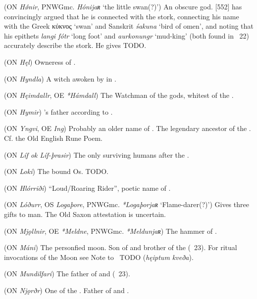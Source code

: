 \begin{itemize}
 (ON \emph{Hǿnir}, PNWGmc. \emph{Hónijaʀ} ‘the little swan(?)’)
  An obscure god. \textcite{Rydberg1886}[552] has convincingly argued that he is connected with the stork, connecting his name with the Greek \textgreek{κύκνος} ‘swan’ and Sanskrit \emph{śakuna} ‘bird of omen’, and noting that his epithets \emph{langi fótr} ‘long foot’ and \emph{aurkonungr} ‘mud-king’ (both found in \Skaldskaparmal\ 22) accurately describe the stork. He gives  TODO.

 (ON \emph{Hęl})
  Owneress of .

 (ON \emph{Hyndla})
  A witch awoken by  in \Hyndluljod.

 (ON \emph{Hęimdallr}, OE \emph{*Hámdall})
  The Watchman of the gods, whitest of the .

 (ON \emph{Hymir})
  ’s father according to \Hymiskvida.

 (ON \emph{Yngvi}, OE \emph{Ing})
  Probably an older name of . The legendary ancestor of the . Cf. the Old English Rune Poem.

 (ON \emph{Líf ok Líf-þrasir})
  The only surviving humans after the .

 (ON \emph{Loki})
  The bound Os. TODO.

 (ON \emph{Hlórriði})
  “Loud/Roaring Rider”, poetic name of .

 (ON \emph{Lóðurr}, OS \emph{Logaþore}, PNWGmc. \emph{*Logaþorjaʀ} ‘Flame-darer(?)’)
  Gives three gifts to man.  The Old Saxon attestation is uncertain.

 (ON \emph{Mjǫllnir}, OE \emph{*Meldne}, PNWGmc. \emph{*Meldunjaʀ})
  The hammer of .

 (ON \emph{Máni})
  The personfied moon.  Son of  and brother of the  (\Vafthrudnismal\ 23).  For ritual invocations of the Moon see Note to \Havamal\ TODO (\emph{hęiptum kveða}).

 (ON \emph{Mundilfari})
  The father of  and  (\Vafthrudnismal\ 23).

 (ON \emph{Njǫrðr})
  One of the . Father of  and .


\end{itemize}

